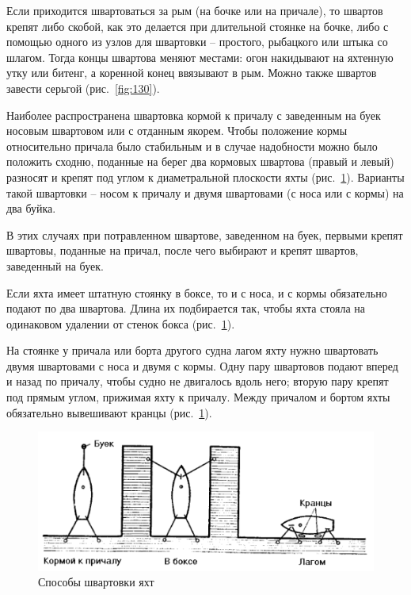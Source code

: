 \documentclass[a4paper, 12pt, twoside, final]{scrbook}
\begin{document}
Если приходится швартоваться за рым (на бочке или на причале), то швартов крепят либо скобой, как это делается при длительной стоянке на бочке, либо с помощью одного из узлов для швартовки \--- простого, рыбацкого или штыка со шлагом. Тогда концы швартова меняют местами: огон накидывают на яхтенную утку или битенг, а коренной конец ввязывают в рым. Можно также швартов завести серьгой (рис.~\ref{fig:130}).

Наиболее распространена швартовка кормой к причалу с заведенным на буек носовым швартовом или с отданным якорем. Чтобы положение кормы относительно причала было стабильным и в случае надобности можно было положить сходню, поданные на берег два кормовых швартова (правый и левый) разносят и крепят под углом к диаметральной плоскости яхты (рис.~\ref{fig:131}). Варианты такой швартовки \--- носом к причалу и двумя швартовами (с носа или с кормы) на два буйка.

В этих случаях при потравленном швартове, заведенном на буек, первыми крепят швартовы, поданные на причал, после чего выбирают и крепят швартов, заведенный на буек.

Если яхта имеет штатную стоянку в боксе, то и с носа, и с кормы обязательно подают по два швартова. Длина их подбирается так, чтобы яхта стояла на одинаковом удалении от стенок бокса (рис.~\ref{fig:131}).

На стоянке у причала или борта другого судна лагом яхту нужно швартовать двумя швартовами с носа и двумя с кормы. Одну пару швартовов подают вперед и назад по причалу, чтобы судно не двигалось вдоль него; вторую пару крепят под прямым углом, прижимая яхту к причалу. Между причалом и бортом яхты обязательно вывешивают кранцы (рис.~\ref{fig:131}).

\begin{figure}[htbp]
   \centering
   \includegraphics{131_Sposoby_shvartovki} %
   \caption{Способы швартовки яхт}
   \label{fig:131}
\end{figure}
\end{document}
